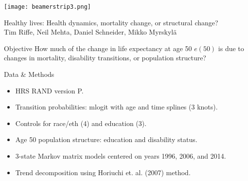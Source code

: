 \documentclass[20pt,usenames,dvipsnames]{beamer}
\begin{document}

\begin{frame}[plain]
	\vspace{-3cm}
 \centerline{\texttt{[image: beamerstrip3.png]}}

	
	\huge
	\vspace{1em}
	
	Healthy lives: Health dynamics, mortality change, or structural change?\\
	\vspace{1em}
	\large 
	Tim Riffe, Neil Mehta, Daniel Schneider, Mikko Myrskyl\"a 
\end{frame}
\begin{frame}[plain]
\Large
\begin{block}{Objective}
How much of the change in life expectancy at age 50 $e(50)$ is due to changes in mortality, disability transitions, or population structure?
\end{block}
\end{frame}
\begin{frame}[plain]
\Large
\begin{block}{Data \& Methods}
\begin{itemize}
\item HRS RAND version P. 
\item Transition probabilities: mlogit with age and time splines (3 knots).
\item Controls for race/eth (4) and education (3). 
\item Age 50 population structure: education and disability status.
\item 3-state Markov matrix models centered on years 1996, 2006, and 2014. 
\item Trend decomposition using Horiuchi et. al. (2007) method.
\end{itemize}
\end{block}
\end{frame}

\begin{frame}[plain]
\Large
\begin{center}
\end{center}
\end{frame}
\end{document}
